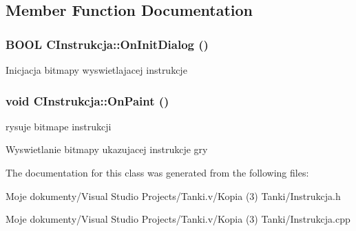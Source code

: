 \subsection{Member Function Documentation}
\subsubsection{\setlength{\rightskip}{0pt plus 5cm}BOOL CInstrukcja::OnInitDialog ()\hspace{0.3cm}{\tt  [virtual]}}\label{class_c_instrukcja_e48328cdf5069384b50f4f7cc36af901}




Inicjacja bitmapy wyswietlajacej instrukcje 
\subsubsection{\setlength{\rightskip}{0pt plus 5cm}void CInstrukcja::OnPaint ()}\label{class_c_instrukcja_6447d4e6e235c2a2168c9820da727043}


rysuje bitmape instrukcji 



Wyswietlanie bitmapy ukazujacej instrukcje gry 

The documentation for this class was generated from the following files:\begin{CompactItemize}
\item 
Moje dokumenty/Visual Studio Projects/Tanki.v/Kopia (3) Tanki/Instrukcja.h\item 
Moje dokumenty/Visual Studio Projects/Tanki.v/Kopia (3) Tanki/Instrukcja.cpp\end{CompactItemize}
